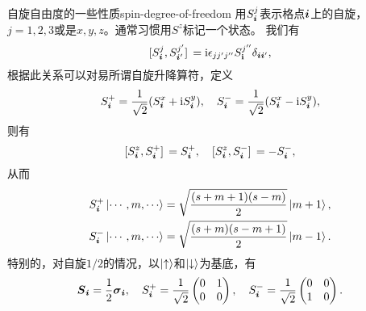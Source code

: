 \begin{back}{自旋自由度的一些性质}{spin-degree-of-freedom}
    用$S^j_{\vb*{i}}$表示格点$\vb*{i}$上的自旋，$j=1, 2, 3$或是$x, y, z$。通常习惯用$S^z$标记一个状态。
    我们有
    \begin{equation}
        \comm*{S^{j}_{\vb*{i}}}{{S}^{j'}_{\vb*{i}'}} = \ii \epsilon_{j j' j''} S_{\vb{i}}^{j''} \delta_{\vb*{i} \vb*{i}'},
    \end{equation}
    根据此关系可以对易所谓自旋升降算符，定义
    \begin{equation}
        {S}_{\vb*{i}}^+ = \frac{1}{\sqrt{2}} ({S}^x_{\vb*{i}} + \mathrm{i} {S}^y_{\vb*{i}}) , \quad {S}_{\vb*{i}}^- = \frac{1}{\sqrt{2}} ({S}^x_{\vb*{i}} - \mathrm{i} {S}^y_{\vb*{i}}) ,
    \end{equation}
    则有
    \begin{equation}
        \comm*{S^z_{\vb*{i}}}{S_{\vb*{i}}^+} = S^+_{\vb*{i}}, \quad \comm*{S^z_{\vb*{i}}}{S_{\vb*{i}}^-} = - S^-_{\vb*{i}},
    \end{equation}
    从而
    \begin{equation}
        \begin{aligned}
            S_{\vb*{i}}^+ \ket{\cdots, m, \cdots} &= \sqrt{\frac{(s + m + 1) (s - m)}{2}} \ket{m + 1}, \\
            S_{\vb*{i}}^- \ket{\cdots, m, \cdots} &= \sqrt{\frac{(s + m) (s - m + 1)}{2}} \ket{m - 1}.
        \end{aligned}
    \end{equation}
    特别的，对自旋$1/2$的情况，以$\ket{\uparrow}$和$\ket{\downarrow}$为基底，有
    \begin{equation}
        \vb*{S}_{\vb*{i}} = \frac{1}{2} \vb*{\sigma}_{\vb*{i}}, \quad {S}_{\vb*{i}}^+ = \frac{1}{\sqrt{2}} \pmqty{0 & 1 \\ 0 & 0}, \quad S_{\vb*{i}}^- = \frac{1}{\sqrt{2}} \pmqty{0 & 0 \\ 1 & 0}.
    \end{equation}
\end{back}

